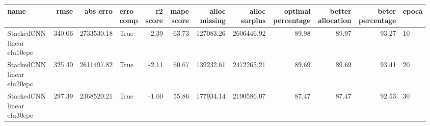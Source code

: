 \begin{tabular}{lrrlrrrrrrrl}
\toprule
name & rmse & abs erro & erro comp & r2 score & mape score & alloc missing & alloc surplus & optimal percentage & better allocation & beter percentage & epoca \\
\midrule
StackedCNN linear elu10epc & 340.06 & 2733530.18 & True & -2.39 & 63.73 & 127083.26 & 2606446.92 & 89.98 & 89.97 & 93.27 & 10 \\
StackedCNN linear elu20epc & 325.40 & 2611497.82 & True & -2.11 & 60.67 & 139232.61 & 2472265.21 & 89.69 & 89.69 & 93.41 & 20 \\
StackedCNN linear elu30epc & 297.39 & 2368520.21 & True & -1.60 & 55.86 & 177934.14 & 2190586.07 & 87.47 & 87.47 & 92.53 & 30 \\
\bottomrule
\end{tabular}
